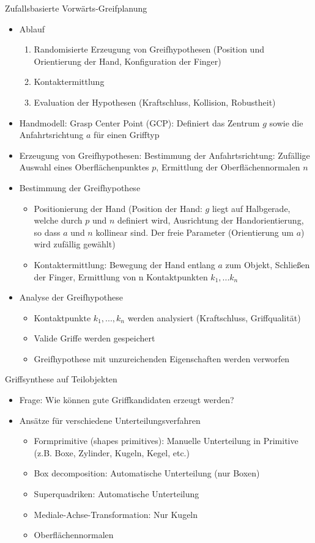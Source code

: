 \documentclass[paper=a4, fontsize=11pt]{scrartcl} %
\numberwithin{equation}{section} %
\numberwithin{figure}{section} %
\numberwithin{table}{section} %
\begin{document}
Zufallsbasierte Vorwärts-Greifplanung
\begin{itemize}
\item Ablauf
\begin{enumerate}
\item Randomisierte Erzeugung von Greifhypothesen (Position und Orientierung der Hand, Konfiguration der Finger)
\item Kontaktermittlung
\item Evaluation der Hypothesen (Kraftschluss, Kollision, Robustheit)
\end{enumerate}
\item Handmodell: Grasp Center Point (GCP): Definiert das Zentrum $g$ sowie die Anfahrtsrichtung $a$ für einen Grifftyp
\item Erzeugung von Greifhypothesen: Bestimmung der Anfahrtsrichtung: Zufällige Auswahl eines Oberflächenpunktes $p$, Ermittlung der Oberflächennormalen $n$
\item Bestimmung der Greifhypothese
\begin{itemize}
\item Positionierung der Hand (Position der Hand: $g$ liegt auf Halbgerade, welche durch $p$ und $n$ definiert wird, Ausrichtung der Handorientierung, so dass $a$ und $n$ kollinear sind. Der freie Parameter (Orientierung um $a$) wird zufällig gewählt)
\item Kontaktermittlung: Bewegung der Hand entlang $a$ zum Objekt, Schließen der Finger, Ermittlung von n Kontaktpunkten $k_1,...k_n$
\end{itemize}
\item Analyse der Greifhypothese
\begin{itemize}
\item Kontaktpunkte $k_1,...,k_n$ werden analysiert (Kraftschluss, Griffqualität)
\item Valide Griffe werden gespeichert
\item Greifhypothese mit unzureichenden Eigenschaften werden verworfen
\end{itemize}
\end{itemize}

Griffsynthese auf Teilobjekten
\begin{itemize}
\item Frage: Wie können gute Griffkandidaten erzeugt werden?
\item Ansätze für verschiedene Unterteilungsverfahren
\begin{itemize}
\item Formprimitive (shapes primitives): Manuelle Unterteilung in Primitive (z.B. Boxe, Zylinder, Kugeln, Kegel, etc.)
\item Box decomposition: Automatische Unterteilung (nur Boxen)
\item Superquadriken: Automatische Unterteilung
\item Mediale-Achse-Transformation: Nur Kugeln
\item Oberflächennormalen
\end{itemize}
\end{itemize}
\end{document}
